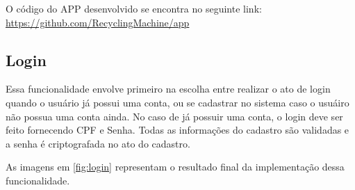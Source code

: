 O código do APP desenvolvido se encontra no seguinte link: \url{https://github.com/RecyclingMachine/app}

\subsection{Login}

Essa funcionalidade envolve primeiro na escolha entre realizar o ato de login quando o usuário já possui uma conta, ou se cadastrar no sistema caso o usuáiro não possua uma conta ainda. No caso de já possuir uma conta, o login deve ser feito fornecendo CPF e Senha. Todas as informações do cadastro são validadas e a senha é criptografada no ato do cadastro.

As imagens em \ref{fig:login} representam o resultado final da implementação dessa funcionalidade.

